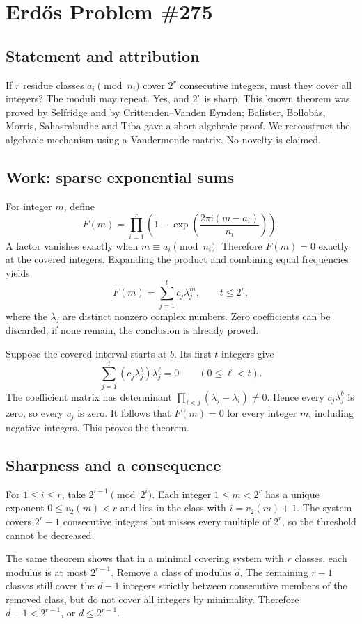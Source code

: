\section{Erd\H{o}s Problem \#275}
\subsection{Statement and attribution}
If $r$ residue classes $a_i\pmod{n_i}$ cover $2^r$ consecutive integers, must they cover all integers? The moduli may repeat. Yes, and $2^r$ is sharp. This known theorem was proved by Selfridge and by Crittenden--Vanden Eynden; Balister, Bollob\'as, Morris, Sahasrabudhe and Tiba gave a short algebraic proof. We reconstruct the algebraic mechanism using a Vandermonde matrix. No novelty is claimed.

\subsection{Work: sparse exponential sums}
For integer $m$, define
\[
 F(m)=\prod_{i=1}^r\left(1-\exp\left(\frac{2\pi\mathrm i(m-a_i)}{n_i}\right)\right).
\]
A factor vanishes exactly when $m\equiv a_i\pmod{n_i}$. Therefore $F(m)=0$ exactly at the covered integers. Expanding the product and combining equal frequencies yields
\[
 F(m)=\sum_{j=1}^t c_j\lambda_j^m,
 \qquad t\le2^r,
\]
where the $\lambda_j$ are distinct nonzero complex numbers. Zero coefficients can be discarded; if none remain, the conclusion is already proved.

Suppose the covered interval starts at $b$. Its first $t$ integers give
\[
 \sum_{j=1}^t(c_j\lambda_j^b)\lambda_j^\ell=0
 \qquad(0\le\ell<t).
\]
The coefficient matrix has determinant $\prod_{i<j}(\lambda_j-\lambda_i)\ne0$. Hence every $c_j\lambda_j^b$ is zero, so every $c_j$ is zero. It follows that $F(m)=0$ for every integer $m$, including negative integers. This proves the theorem.

\subsection{Sharpness and a consequence}
For $1\le i\le r$, take $2^{i-1}\pmod{2^i}$. Each integer $1\le m<2^r$ has a unique exponent $0\le v_2(m)<r$ and lies in the class with $i=v_2(m)+1$. The system covers $2^r-1$ consecutive integers but misses every multiple of $2^r$, so the threshold cannot be decreased.

The same theorem shows that in a minimal covering system with $r$ classes, each modulus is at most $2^{r-1}$. Remove a class of modulus $d$. The remaining $r-1$ classes still cover the $d-1$ integers strictly between consecutive members of the removed class, but do not cover all integers by minimality. Therefore $d-1<2^{r-1}$, or $d\le2^{r-1}$.


